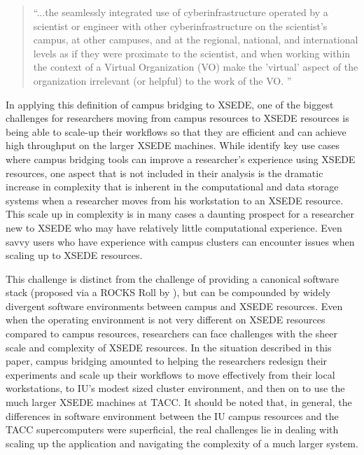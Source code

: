 \documentclass{sig-alternate}
\begin{document}
\begin{quotation}
``...the seamlessly integrated use of cyberinfrastructure operated by a scientist or engineer
with other cyberinfrastructure on the scientist's campus, at other campuses, and at the regional, national,
and international levels as if they were proximate to the scientist, and when working within the context of a
Virtual Organization (VO) make the 'virtual' aspect of the organization irrelevant (or helpful) to the work of
the VO. \cite{stewart2012}''
\end{quotation}

In applying this definition of campus bridging to XSEDE, one of the biggest challenges for researchers moving
from campus resources to XSEDE resources is being able to scale-up their workflows so that they are efficient
and can achieve high throughput on the larger XSEDE machines. While \citeauthor{stewart2012} identify key use
cases where campus bridging tools can improve a researcher's experience using XSEDE resources, one aspect that
is not included in their analysis is the dramatic increase in complexity that is inherent in the computational
and data storage systems when a researcher moves from his workstation to an XSEDE resource. This scale up in
complexity is in many cases a daunting prospect for a researcher new to XSEDE who may have relatively little
computational experience. Even savvy users who have experience with campus clusters can encounter issues when
scaling up to XSEDE resources.

This challenge is distinct from the challenge of providing a canonical software stack (proposed via a ROCKS
Roll by \citeauthor{stewart2012}), but can be compounded by widely divergent software environments between
campus and XSEDE resources. Even when the operating environment is not very different on XSEDE resources
compared to campus resources, researchers can face challenges with the sheer scale and complexity of XSEDE
resources. In the situation described in this paper, campus bridging amounted to helping the researchers
redesign their experiments and scale up their workflows to move effectively from their local workstations, to IU's modest
sized cluster environment, and then on to use the much larger XSEDE machines at TACC. It should be
noted that, in general, the differences in software environment between the IU campus resources and the TACC
supercomputers were superficial, the real challenges lie in dealing with scaling up the application and
navigating the complexity of a much larger system.
\end{document}
